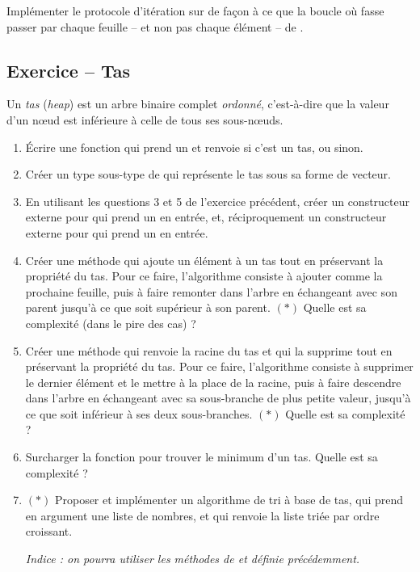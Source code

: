 \documentclass{article}
\newcounter{loop}
\newcounter{numEx}
\newcommand{\exo}[1]{
	\stepcounter{numEx}
	\setcounter{loop}{0}
	\subsection*{Exercice \arabic{numEx} -- #1}
}
\begin{document}
Implémenter le protocole d'itération sur  de façon à ce que la boucle  où  fasse passer  par chaque feuille -- et non pas chaque élément -- de .

\exo{Tas}

Un \emph{tas} (\textit{heap}) est un arbre binaire complet \emph{ordonné}, c'est-à-dire que la valeur d'un nœud est inférieure à celle de tous ses sous-nœuds.

\begin{enumerate}
	
	\item Écrire une fonction  qui prend un  et renvoie  si c'est un tas, ou  sinon.
	
	\item Créer un type  sous-type de  qui représente le tas sous sa forme de vecteur.
	
	\item En utilisant les questions 3 et 5 de l'exercice précédent, créer un constructeur externe pour  qui prend un  en entrée, et, réciproquement un constructeur externe pour  qui prend un  en entrée.
	
	\item Créer une méthode  qui ajoute un élément  à un tas  tout en préservant la propriété du tas. Pour ce faire, l'algorithme consiste à ajouter  comme la prochaine feuille, puis à faire remonter  dans l'arbre en échangeant  avec son parent jusqu'à ce que  soit supérieur à son parent. $(*)$ Quelle est sa complexité (dans le pire des cas) ?
	
	\item Créer une méthode  qui renvoie la racine du tas et qui la supprime tout en préservant la propriété du tas. Pour ce faire, l'algorithme consiste à supprimer le dernier élément  et le mettre à la place de la racine, puis à faire descendre  dans l'arbre en échangeant  avec sa sous-branche de plus petite valeur, jusqu'à ce que  soit inférieur à ses deux sous-branches. $(*)$ Quelle est sa complexité ?
	
	\item Surcharger la fonction  pour trouver le minimum d'un tas. Quelle est sa complexité ?
	
	\item $(*)$ Proposer et implémenter un algorithme de tri à base de tas, qui prend en argument une liste de nombres, et qui renvoie la liste triée par ordre croissant.
	
	\textit{Indice : on pourra utiliser les méthodes de  et  définie précédemment.}
\end{enumerate}
\end{document}

